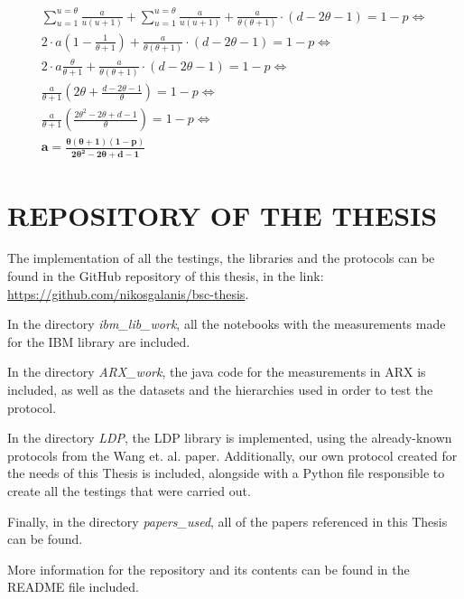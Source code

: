 \documentclass[inscr]{dithesis}
\begin{document}
\begin{appendix}
\begin{align*}
    \sum_{u = 1}^{u = \theta} \frac{a}{u (u + 1)} + \sum_{u = 1}^{u = \theta} \frac{a}{u (u + 1)} + \frac{a}{\theta(\theta+1)} \cdot (d - 2\theta - 1) = 1 - p \Longleftrightarrow\\
    2 \cdot a (1 - \frac{1}{\theta + 1}) + \frac{a}{\theta(\theta+1)} \cdot (d - 2\theta - 1) = 1 - p \Longleftrightarrow\\
    2 \cdot a \frac{\theta}{\theta + 1} + \frac{a}{\theta(\theta+1)} \cdot (d - 2\theta - 1) = 1 - p \Longleftrightarrow\\
    \frac{a}{\theta + 1}(2 \theta + \frac{d - 2\theta - 1}{\theta}) = 1 - p \Longleftrightarrow \\ 
    \frac{a}{\theta + 1}(\frac{2\theta^2 - 2\theta + d - 1}{\theta}) = 1 - p \Longleftrightarrow \\ 
    \mathbf{a = \frac{\theta(\theta + 1) (1 - p)}{2\theta^2 - 2\theta + d - 1}}
\end{align*}

\chapter{REPOSITORY OF THE THESIS}
The implementation of all the testings, the libraries and the protocols can be found in the GitHub repository of this thesis, in the link: \url{https://github.com/nikosgalanis/bsc-thesis}. 

In the directory \textit{ibm\_lib\_work}, all the notebooks with the measurements made for the IBM library are included.

In the directory \textit{ARX\_work}, the java code for the measurements in ARX is included, as well as the datasets and the hierarchies used in order to test the protocol.

In the directory \textit{LDP}, the LDP library is implemented, using the already-known protocols from the Wang et. al. paper. Additionally, our own protocol created for the needs of this Thesis is included, alongside with a Python file responsible to create all the testings that were carried out.

Finally, in the directory \textit{papers\_used}, all of the papers referenced in this Thesis can be found. 


More information for the repository and its contents can be found in the README file included.

\end{appendix}


{\footnotesize }
\end{document}
